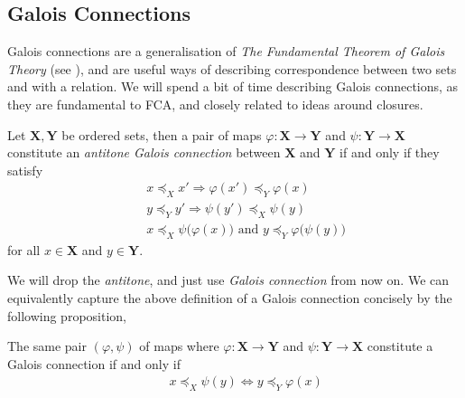 \subsection{Galois Connections}
\label{subsection:galois-connections}

Galois connections are a generalisation of \textit{The Fundamental Theorem of Galois Theory} (see \cite[pp. 205]{bergman2015invitation}), and are useful ways of describing
correspondence between two sets and with a relation. We will spend a bit of time describing Galois connections, as they are fundamental to FCA, and closely related to ideas around closures.

\begin{definition}
  \label{definition:Galois-connection-1} Let $\mathbf{X}, \mathbf{Y}$ be ordered sets, then a pair of maps $\varphi \colon \mathbf{X}\to \mathbf{Y}$ and
  $\psi \colon \mathbf{Y}\to \mathbf{X}$ constitute an \emph{antitone Galois connection} between $\mathbf{X}$ and $\mathbf{Y}$ if and only if they satisfy
  \begin{align}
    \quad & x \preceq_{X}x' \Rightarrow \varphi (x') \preceq_{Y}\varphi (x) \label{equation:ord_galois-1}                             \\
    \quad & y \preceq_{Y}y' \Rightarrow \psi (y') \preceq_{X}\psi (y) \label{equation:ord-galois-2}                                   \\
    \quad & x \preceq_{X}\psi \big(\varphi (x)\big) \text{ and }y \preceq_{Y}\varphi \big(\psi (y)\big) \label{equation:ord-galois-3}
  \end{align}
  for all $x \in \mathbf{X}$ and $y \in \mathbf{Y}$.
\end{definition}

We will drop the \textit{antitone}, and just use \textit{Galois connection} from now on. We can equivalently capture the above definition of a Galois connection concisely by the
following proposition,

\begin{proposition}
  \label{proposition:fundemental-galois} The same pair $(\varphi, \psi)$ of maps where $\varphi \colon \mathbf{X}\to \mathbf{Y}$ and $\psi \colon \mathbf{Y}\to \mathbf{X}$ constitute
  a Galois connection if and only if
  \begin{align}
    \quad & x \preceq_{X}\psi (y) \Longleftrightarrow y \preceq_{Y}\varphi (x) \label{equation:ord-galois-4}
  \end{align}
\end{proposition}


